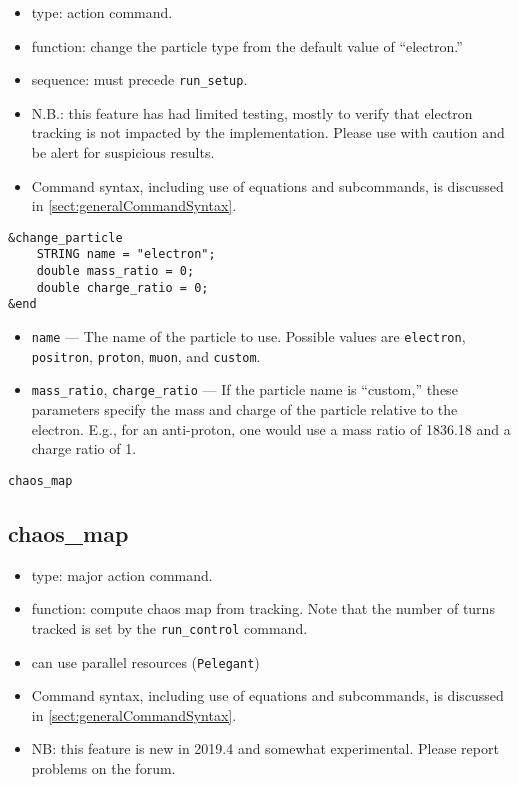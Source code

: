 \documentclass[11pt]{article}
\begin{document}
\begin{itemize}
\item type: action command.
\item function: change the particle type from the default value of ``electron.''
\item sequence: must precede \verb|run_setup|.
\item N.B.: this feature has had limited testing, mostly to verify that electron tracking is not
 impacted by the implementation.  Please use with caution and be alert for suspicious results.
\item Command syntax, including use of equations and subcommands, is discussed in \ref{sect:generalCommandSyntax}.
\end{itemize}

\begin{verbatim}
&change_particle
    STRING name = "electron";
    double mass_ratio = 0;
    double charge_ratio = 0;
&end
\end{verbatim}

\begin{itemize}
\item \verb|name| --- The name of the particle to use.  Possible values are \verb|electron|, \verb|positron|,
  \verb|proton|, \verb|muon|, and \verb|custom|.
\item \verb|mass_ratio|, \verb|charge_ratio| --- If the particle name is ``custom,'' these parameters specify the
  mass and charge of the particle relative to the electron.  E.g., for an anti-proton, one would use
  a mass ratio of 1836.18 and a charge ratio of 1.
\end{itemize}

\newpage
\begin{center}{\Large\verb|chaos_map|}\end{center}
\subsection{chaos\_map \label{subsec:chaosmap}}

\begin{itemize}
\item type: major action command.  
\item function: compute chaos map from tracking.
      Note that the number of turns tracked is set by the \verb|run_control| command.
\item can use parallel resources (\verb|Pelegant|)
\item Command syntax, including use of equations and subcommands, is discussed in \ref{sect:generalCommandSyntax}.
\item NB: this feature is new in 2019.4 and somewhat experimental. Please report problems on the forum.
\end{itemize}
\end{document}
